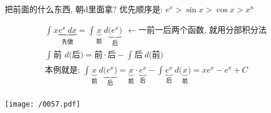 \documentclass[UTF8]{ctexart}
\begin{document}
	把前面的什么东西, 朝d里面拿? 优先顺序是: $e^x  > \sin x > \cos x > x^n$ \\
	
	\begin{myEnvSample}
		\begin{align*}
	&\int_{}^{}{x\underset{\text{先做}}{\underbrace{e^x\ dx}}}=\int_{}^{}{\underset{\text{前}}{\underbrace{x}}}\ d\underset{\text{后}}{\underbrace{\text{(}e^x\text{)}}}\ \ \gets \text{一前一后两个函数,\ 就用分部积分法}\\
&\int_{}^{}{\text{前\ }d\text{(后)}}=\text{前}\cdot \text{后}-\int_{}^{}{\text{后}}\ d\text{(前)}\\
&\text{本例就是:\ }\int_{}^{}{\underset{\text{前}}{\underbrace{x}}}\ d\underset{\text{后}}{\underbrace{\text{(}e^x\text{)}}}=\underset{\text{前}}{\underbrace{x}}\cdot \underset{\text{后}}{\underbrace{e^x}}-\int_{}^{}{\underset{\text{后}}{\underbrace{e^x}}\ d\text{(}\underset{\text{前}}{\underbrace{x}}\text{)}}=xe^x-e^x+C\\
		\end{align*}
	\end{myEnvSample}
	
	
	\begin{myEnvSample}
\texttt{[image: /0057.pdf]}
	\end{myEnvSample}
	
	
	
	
	
	
	
	
	
	
	
	
	
	
\end{document}
